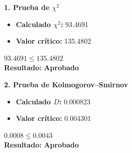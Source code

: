 \noindent
\begin{minipage}[t]{0.48\textwidth}
    \textbf{1. Prueba de \(\chi^2\)}
    \vspace{0.3cm}
    \begin{itemize}[itemsep=0.4em]
        \item \textbf{Calculado \(\chi^2\):} 93.4691
        \item \textbf{Valor crítico:} 135.4802
    \end{itemize}

    \begin{center}
        \vspace{0.5cm}
        \(93.4691 \leq 135.4802\)
        \vspace{0.1cm}
        \\\textbf{Resultado: }
        \textcolor{green!60!black}{\textbf{Aprobado}}
    \end{center}

    \vspace{0.8cm}

    \textbf{2. Prueba de Kolmogorov--Smirnov}
    \vspace{0.3cm}
    \begin{itemize}[itemsep=0.4em]
        \item \textbf{Calculado \(D\):} 0.000823
        \item \textbf{Valor crítico:} 0.004301
    \end{itemize}
    \begin{center}
        \vspace{0.5cm}
        \(0.0008 \leq 0.0043\)
        \vspace{0.1cm}
        \\\textbf{Resultado: }
        \textcolor{green!60!black}{\textbf{Aprobado}}
    \end{center}

\end{minipage}
\hfill
